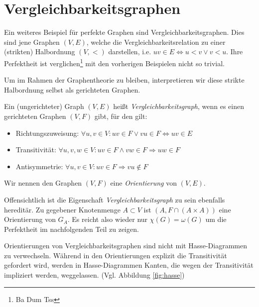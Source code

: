 \documentclass[../main.tex]{subfiles}
\begin{document}
\chapter{Vergleichbarkeitsgraphen}
\label{chapter:ordnungsgraphen}

Ein weiteres Beispiel für perfekte Graphen sind Vergleichbarkeitsgraphen. Dies sind jene Graphen $(V, E)$, welche die Vergleichbarkeitsrelation zu einer (strikten) Halbordnung $(V, <)$ darstellen, i.e. $uv \in E \Leftrightarrow u < v \vee v < u$. Ihre Perfektheit ist verglichen\footnote{Ba Dum Tss} mit den vorherigen Beispielen nicht so trivial.

Um im Rahmen der Graphentheorie zu bleiben, interpretieren wir diese strikte Halbordnung selbst als gerichteten Graphen.

\begin{definition}[Vergleichbarkeitsgraph]
    Ein (ungerichteter) Graph $(V, E)$ heißt \emph{Vergleichbarkeitsgraph}, wenn es einen gerichteten Graphen $(V, F)$ gibt, für den gilt:
    \begin{itemize}
        \item Richtungszuweisung: $\forall u, v \in V : uv \in F \vee vu \in F \Leftrightarrow uv \in E$
        \item Transitivität: $\forall u, v, w \in V : uv \in F \wedge vw \in F \Rightarrow uw \in F$
        \item Antisymmetrie: $\forall u, v \in V : uv \in F \Rightarrow vu \notin F$
    \end{itemize}
    Wir nennen den Graphen $(V, F)$ eine \emph{Orientierung} von $(V, E)$.
\end{definition}

Offensichtlich ist die Eigenschaft \emph{Vergleichbarkeitsgraph} zu sein ebenfalls hereditär. Zu gegebener Knotenmenge $A \subset V$ ist $(A, F \cap (A \times A))$ eine Orientierung von $G_A$. Es reicht also wieder nur $\chi(G) = \omega(G)$ um die Perfektheit im nachfolgenden Teil zu zeigen.

\begin{bemerkung}
    Orientierungen von Vergleichbarkeitsgraphen sind nicht mit Hasse-Diagrammen zu verwechseln. Während in den Orientierungen explizit die Transitivität gefordert wird, werden in Hasse-Diagrammen Kanten, die wegen der Transitivität impliziert werden, weggelassen. (Vgl. Abbildung \ref{fig:hasse})
\end{bemerkung}
\end{document}
